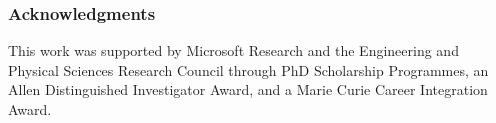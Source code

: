 \documentclass{article}
\begin{document}
\subsubsection*{Acknowledgments}
This work was supported by Microsoft Research and the Engineering and Physical Sciences Research Council through PhD Scholarship Programmes, an Allen Distinguished Investigator Award, and a Marie Curie Career Integration Award.



\end{document}
